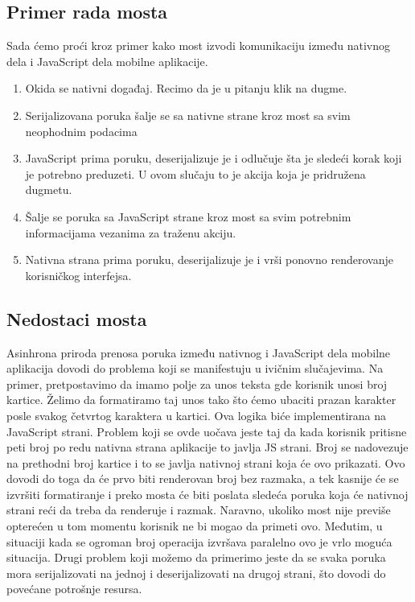\documentclass[12pt,oneside]{memoir}
\begin{document}
\subsection{Primer rada mosta}

Sada ćemo proći kroz primer kako most izvodi komunikaciju između nativnog dela i JavaScript dela mobilne aplikacije.

\begin{enumerate}
    \item Okida se nativni događaj. Recimo da je u pitanju klik na dugme.
    \item Serijalizovana poruka šalje se sa nativne strane kroz most sa svim neophodnim podacima
    \item JavaScript prima poruku, deserijalizuje je i odlučuje šta je sledeći korak koji je potrebno preduzeti. U ovom slučaju to je akcija koja je pridružena dugmetu.
    \item Šalje se poruka sa JavaScript strane kroz most sa svim potrebnim informacijama vezanima za traženu akciju.
    \item Nativna strana prima poruku, deserijalizuje je i vrši ponovno renderovanje korisničkog interfejsa.
\end{enumerate}

\subsection{Nedostaci mosta}

Asinhrona priroda prenosa poruka između nativnog i JavaScript dela mobilne aplikacija dovodi do problema koji se manifestuju u ivičnim slučajevima. Na primer, pretpostavimo da imamo polje za unos teksta gde korisnik unosi broj kartice. Želimo da formatiramo taj unos tako što ćemo ubaciti prazan karakter posle svakog četvrtog karaktera u kartici. Ova logika biće implementirana na JavaScript strani. Problem koji se ovde uočava jeste taj da kada korisnik pritisne peti broj po redu nativna strana aplikacije to javlja JS strani. Broj se nadovezuje na prethodni broj kartice i to se javlja nativnoj strani koja će ovo prikazati. Ovo dovodi do toga da će prvo biti renderovan broj bez razmaka, a tek kasnije će se izvršiti formatiranje i preko mosta će biti poslata sledeća poruka koja će nativnoj strani reći da treba da renderuje i razmak. Naravno, ukoliko most nije previše opterećen u tom momentu korisnik ne bi mogao da primeti ovo. Međutim, u situaciji kada se ogroman broj operacija izvršava paralelno ovo je vrlo moguća situacija. Drugi problem koji možemo da primerimo jeste da se svaka poruka mora serijalizovati na jednoj i deserijalizovati na drugoj strani, što dovodi do povećane potrošnje resursa.
\end{document}

